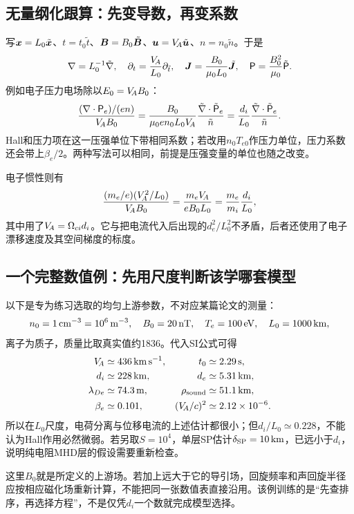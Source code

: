 \subsection{无量纲化跟算：先变导数，再变系数}
写$\bm{x}=L_0\tilde{\bm{x}}$、$t=t_0\tilde t$、$\bm{B}=B_0\tilde{\bm{B}}$、$\bm{u}=V_{\!A}\tilde{\bm{u}}$、$n=n_0\tilde n$。于是
\begin{equation}
 \nabla=L_0^{-1}\tilde{\nabla},\quad
 \partial_t={V_{\!A}\over L_0}\partial_{\tilde t},\quad
 \bm{J}={B_0\over\mu_0L_0}\tilde{\bm{J}},\quad
 \mathsf P={B_0^2\over\mu_0}\tilde{\mathsf P}.
\end{equation}
例如电子压力电场除以$E_0=V_{\!A} B_0$：
\begin{equation}
 {(\nabla\cdot\mathsf P_e)/(en)\over V_{\!A}B_0}
 ={B_0\over\mu_0en_0L_0V_{\!A}}
 {\tilde{\nabla}\cdot\tilde{\mathsf P}_e\over\tilde n}
 ={d_i\over L_0}
 {\tilde{\nabla}\cdot\tilde{\mathsf P}_e\over\tilde n}.
\end{equation}
Hall和压力项在这一压强单位下带相同系数；若改用$n_0T_{e0}$作压力单位，压力系数还会带上$\beta_e/2$。两种写法可以相同，前提是压强变量的单位也随之改变。

电子惯性则有
\begin{equation}
 {(m_e/e)(V_{\!A}^2/L_0)\over V_{\!A}B_0}
 ={m_eV_{\!A}\over eB_0L_0}
 ={m_e\over m_i}{d_i\over L_0},
\end{equation}
其中用了$V_{\!A}=\Omega_{ci}d_i$。它与把电流代入后出现的$d_e^2/L_0^2$不矛盾，后者还使用了电子漂移速度及其空间梯度的标度。

\subsection{一个完整数值例：先用尺度判断该学哪套模型}
以下是专为练习选取的均匀上游参数，不对应某篇论文的测量：
\begin{equation}
 n_0=1\,{\rm cm^{-3}}=10^6\,{\rm m^{-3}},\quad
 B_0=20\,{\rm nT},\quad T_e=100\,{\rm eV},\quad
 L_0=1000\,{\rm km},
\end{equation}
离子为质子，质量比取真实值约1836。代入SI公式可得
\begin{align}
 V_{\!A}&\simeq436\,{\rm km\,s^{-1}},&
 t_0&\simeq2.29\,{\rm s},\\
 d_i&\simeq228\,{\rm km},&
 d_e&\simeq5.31\,{\rm km},\\
 \lambda_{De}&\simeq74.3\,{\rm m},&
 \rho_{\rm sound}&\simeq51.1\,{\rm km},\\
 \beta_e&\simeq0.101,&
 (V_{\!A}/c)^2&\simeq2.12\times10^{-6}.
\end{align}
所以在$L_0$尺度，电荷分离与位移电流的上述估计都很小；但$d_i/L_0\simeq0.228$，不能认为Hall作用必然微弱。若另取$S=10^4$，单层SP估计$\delta_{\rm SP}=10\,{\rm km}$，已远小于$d_i$，说明纯电阻MHD层的假设需要重新检查。

这里$B_0$就是所定义的上游场。若加上远大于它的导引场，回旋频率和声回旋半径应按相应磁化场重新计算，不能把同一张数值表直接沿用。该例训练的是“先查排序，再选择方程”，不是仅凭$d_i$一个数就完成模型选择。
